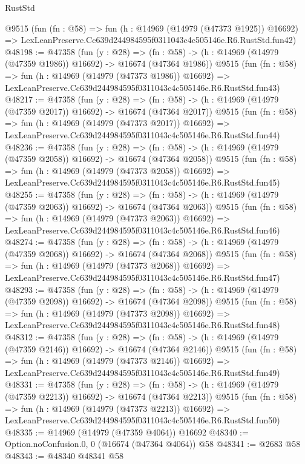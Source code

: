 \begin{lexlean}{RustStd}
\begin{coremodule}
    @9515
    (fun (fn : @58) =>
    fun (h : @14969 (@14979 (@47373 @1925)) @16692) =>
    LexLeanPreserve.Cc639d244984595f0311043c4c505146e.R6.RustStd.fun42)
@48198 := @47358
    (fun (y : @28) =>
    (fn : @58) -> (h : @14969 (@14979 (@47359 @1986)) @16692) -> @16674 (@47364 @1986))
    @9515
    (fun (fn : @58) =>
    fun (h : @14969 (@14979 (@47373 @1986)) @16692) =>
    LexLeanPreserve.Cc639d244984595f0311043c4c505146e.R6.RustStd.fun43)
@48217 := @47358
    (fun (y : @28) =>
    (fn : @58) -> (h : @14969 (@14979 (@47359 @2017)) @16692) -> @16674 (@47364 @2017))
    @9515
    (fun (fn : @58) =>
    fun (h : @14969 (@14979 (@47373 @2017)) @16692) =>
    LexLeanPreserve.Cc639d244984595f0311043c4c505146e.R6.RustStd.fun44)
@48236 := @47358
    (fun (y : @28) =>
    (fn : @58) -> (h : @14969 (@14979 (@47359 @2058)) @16692) -> @16674 (@47364 @2058))
    @9515
    (fun (fn : @58) =>
    fun (h : @14969 (@14979 (@47373 @2058)) @16692) =>
    LexLeanPreserve.Cc639d244984595f0311043c4c505146e.R6.RustStd.fun45)
@48255 := @47358
    (fun (y : @28) =>
    (fn : @58) -> (h : @14969 (@14979 (@47359 @2063)) @16692) -> @16674 (@47364 @2063))
    @9515
    (fun (fn : @58) =>
    fun (h : @14969 (@14979 (@47373 @2063)) @16692) =>
    LexLeanPreserve.Cc639d244984595f0311043c4c505146e.R6.RustStd.fun46)
@48274 := @47358
    (fun (y : @28) =>
    (fn : @58) -> (h : @14969 (@14979 (@47359 @2068)) @16692) -> @16674 (@47364 @2068))
    @9515
    (fun (fn : @58) =>
    fun (h : @14969 (@14979 (@47373 @2068)) @16692) =>
    LexLeanPreserve.Cc639d244984595f0311043c4c505146e.R6.RustStd.fun47)
@48293 := @47358
    (fun (y : @28) =>
    (fn : @58) -> (h : @14969 (@14979 (@47359 @2098)) @16692) -> @16674 (@47364 @2098))
    @9515
    (fun (fn : @58) =>
    fun (h : @14969 (@14979 (@47373 @2098)) @16692) =>
    LexLeanPreserve.Cc639d244984595f0311043c4c505146e.R6.RustStd.fun48)
@48312 := @47358
    (fun (y : @28) =>
    (fn : @58) -> (h : @14969 (@14979 (@47359 @2146)) @16692) -> @16674 (@47364 @2146))
    @9515
    (fun (fn : @58) =>
    fun (h : @14969 (@14979 (@47373 @2146)) @16692) =>
    LexLeanPreserve.Cc639d244984595f0311043c4c505146e.R6.RustStd.fun49)
@48331 := @47358
    (fun (y : @28) =>
    (fn : @58) -> (h : @14969 (@14979 (@47359 @2213)) @16692) -> @16674 (@47364 @2213))
    @9515
    (fun (fn : @58) =>
    fun (h : @14969 (@14979 (@47373 @2213)) @16692) =>
    LexLeanPreserve.Cc639d244984595f0311043c4c505146e.R6.RustStd.fun50)
@48335 := @14969 (@14979 (@47359 @4064)) @16692
@48340 := Option.noConfusion.{0, 0} (@16674 (@47364 @4064)) @58
@48341 := @2683 @58
@48343 := @48340 @48341 @58

\end{coremodule}
\end{lexlean}
